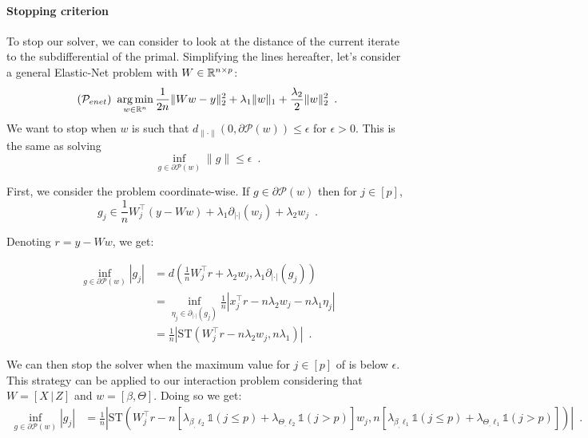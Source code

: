 \documentclass[a4]{article}
\begin{document}
\paragraph{Stopping criterion}

To stop our solver, we can consider to look at the distance of the current iterate to the subdifferential of the primal.
Simplifying the lines hereafter, let's consider a general Elastic-Net problem with $W\in\mathbb{R}^{n\times p}$:
\[(\mathcal{P}_{enet})\ \mathop{\mathrm{arg\,min}}_{w\in\mathbb{R}^n} \frac{1}{2n} \|Ww - y\|^2_2 + \lambda_1 \|w\|_1 + \frac{\lambda_2}{2}\|w\|^2_2\enspace.\]
We want to stop when $w$ is such that $d_{\|\cdot\|}(0, \partial\mathcal{P}(w))\leq \epsilon$ for $\epsilon > 0$.
This is the same as solving
\[\inf_{g\in \partial\mathcal{P}(w)} \|g\|\leq\epsilon\enspace.\]
\smallskip

First, we consider the problem coordinate-wise.
If $g\in\partial\mathcal{P}(w)$ then for $j\in [p]$,
\[g_j \in \frac{1}{n} W_j^\top (y - W w) + \lambda_1 \partial_{|\cdot|}(w_j) + \lambda_2 w_j\enspace.\]

Denoting $r=y - Ww$, we get:

\begin{align}
	\inf_{g\in\partial\mathcal{P}(w)} |g_j|
			&= d\left(\frac{1}{n} W_j^\top r + \lambda_2 w_j,  \lambda_1\partial_{|\cdot|}(g_j) \right) \\
			&= \inf_{\eta_j \in \partial_{|\cdot|}(g_j)} \frac{1}{n} \left| x_j^\top r - n \lambda_2 w_j  - n \lambda_1 \eta_j\right| \\
			&= \frac{1}{n} \left| \mathrm{ST}\left( W_j^\top r - n \lambda_2 w_j, n\lambda_1 \right) \right| \enspace.  \label{eq:stop_coord}
\end{align}

We can then stop the solver when the maximum value for $j\in[p]$ of  is below $\epsilon$.
This strategy can be applied to our interaction problem considering that $W = [X \,|\, Z]$ and $w=[\beta, \Theta]$. Doing so we get:
\begin{align} \label{eq:stop_inter}
	\inf_{g\in\partial\mathcal{P}(w)} |g_j|
			&= \frac{1}{n} \left| \mathrm{ST}\left( W_j^\top r - n [\lambda_{\beta_, \ell_2} \mathds{1}(j \leq p) + \lambda_{\Theta_, \ell_2} \mathds{1}(j > p)] w_j, n[\lambda_{\beta_, \ell_1} \mathds{1}(j \leq p) + \lambda_{\Theta_, \ell_1} \mathds{1}(j > p)] \right) \right| \enspace.
\end{align}
\end{document}
